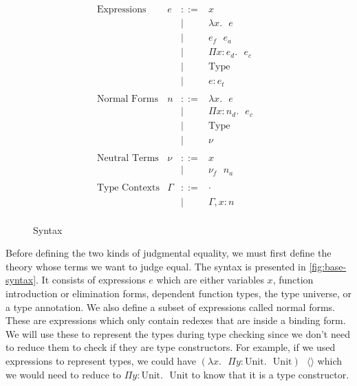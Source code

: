 \documentclass[sigplan,nonacm]{acmart}
\newcommand{\bnfdef}{::=}
\newcommand{\bnfalt}{\mid}
\newcommand{\bnfcomment}[1]{}%
\newcommand{\lamE}[2]{\lambda #1. \text{ } #2}
\newcommand{\appE}[2]{#1 \text{ } #2}
\newcommand{\piE}[3]{\Pi #1 : #2. \text{ } #3}
\newcommand{\unitE}{\langle \rangle}
\newcommand{\unittE}{\text{Unit}}
\newcommand{\univE}{\text{Type}}
\newcommand{\annE}[2]{#1 : #2}
\begin{document}
\begin{figure}[!htb]
  \begin{displaymath}
    \begin{array}{lrcll}
      \text{Expressions} & e & \bnfdef & x & \bnfcomment{variables} \\
      & & \bnfalt & \lamE{x}{e} & \bnfcomment{function literal} \\
      & & \bnfalt & \appE{e_f}{e_a} & \bnfcomment{function application} \\
      & & \bnfalt & \piE{x}{e_d}{e_c} & \bnfcomment{dependent function type} \\
      & & \bnfalt & \univE & \bnfcomment{type universe} \\
      & & \bnfalt & \annE{e}{e_t} & \bnfcomment{type annotation} \\
      \\
      \text{Normal Forms} & n & \bnfdef & \lamE{x}{e} & \\
      & & \bnfalt & \piE{x}{n_d}{e_c} & \\
      & & \bnfalt & \univE & \\
      & & \bnfalt & \nu & \\
      \\
      \text{Neutral Terms} & \nu & \bnfdef & x & \\
      & & \bnfalt & \appE{\nu_f}{n_a} & \\
      \\
      \text{Type Contexts} & \Gamma & \bnfdef & \cdot & \\
      & & \bnfalt & \Gamma, x : n & \\
    \end{array}
  \end{displaymath}
  \caption{Syntax}
  \label{fig:base-syntax}
\end{figure}

Before defining the two kinds of judgmental equality, we must first define the theory whose terms we want to judge equal.
The syntax is presented in \autoref{fig:base-syntax}.
It consists of expressions $e$ which are either variables $x$, function introduction or elimination forms, dependent function types, the type universe, or a type annotation.
We also define a subset of expressions called normal forms.
These are expressions which only contain redexes that are inside a binding form.
We will use these to represent the types during type checking since we don't need to reduce them to check if they are type constructors.
For example, if we used expressions to represent types, we could have $\appE{(\lamE{x}{\piE{y}{\unittE}{\unittE}})}{\unitE}$ which we would need to reduce to $\piE{y}{\unittE}{\unittE}$ to know that it is a type constructor.
\end{document}
